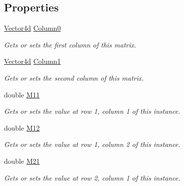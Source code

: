 \subsection*{Properties}
\begin{DoxyCompactItemize}
\item 
\hyperlink{struct_open_t_k_1_1_vector4d}{Vector4d} \hyperlink{struct_open_t_k_1_1_matrix4x2d_ab679a61415960414727035131b646a57}{Column0}
\begin{DoxyCompactList}\small\item\em Gets or sets the first column of this matrix. \end{DoxyCompactList}\item 
\hyperlink{struct_open_t_k_1_1_vector4d}{Vector4d} \hyperlink{struct_open_t_k_1_1_matrix4x2d_a5ad56a89a41f5b62ec0ac162678f411a}{Column1}
\begin{DoxyCompactList}\small\item\em Gets or sets the second column of this matrix. \end{DoxyCompactList}\item 
double \hyperlink{struct_open_t_k_1_1_matrix4x2d_aff61b5a2a7217269005d2273ba315f32}{M11}
\begin{DoxyCompactList}\small\item\em Gets or sets the value at row 1, column 1 of this instance. \end{DoxyCompactList}\item 
double \hyperlink{struct_open_t_k_1_1_matrix4x2d_a69594dd44138f0a1df02d1f7c55254d6}{M12}
\begin{DoxyCompactList}\small\item\em Gets or sets the value at row 1, column 2 of this instance. \end{DoxyCompactList}\item 
double \hyperlink{struct_open_t_k_1_1_matrix4x2d_af97acd326d522e5ec3b081b979a45cd2}{M21}
\begin{DoxyCompactList}\small\item\em Gets or sets the value at row 2, column 1 of this instance. \end{DoxyCompactList}\item 

\end{DoxyCompactItemize}

